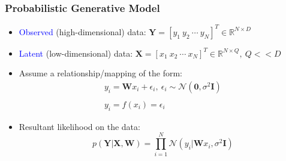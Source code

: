 \documentclass[10pt]{beamer}
\begin{document}
  \begin{frame}
  \frametitle{Probabilistic Generative Model}

  \begin{itemize}
    \item \textcolor{blue}{Observed} (high-dimensional) data: $\mathbf{Y} = [y_1~y_2~\cdots~y_N]^T \in \mathbb{R}^{N \times D}$
    \item \textcolor{blue}{Latent} (low-dimensional) data: $\mathbf{X} = [x_1~x_2~\cdots~x_N]^T \in \mathbb{R}^{N \times Q},~Q << D$
    \item Assume a relationship/mapping of the form:
      \begin{equation}
        \begin{array}{c}
          y_i = \mathbf{W}x_i + \epsilon_i,~\epsilon_i \sim \mathcal{N}(\mathbf{0},\sigma^2\mathbf{I})\\~\\
          y_i = f(x_i) = \epsilon_i
        \end{array}
      \end{equation}
    \item Resultant likelihood on the data:
      \begin{equation}
        p(\mathbf{Y}|\mathbf{X},\mathbf{W}) = \prod_{i = 1}^N \mathcal{N}(y_i | \mathbf{W}x_i, \sigma^2\mathbf{I})
      \end{equation}
  \end{itemize}

  \end{frame}
\end{document}
